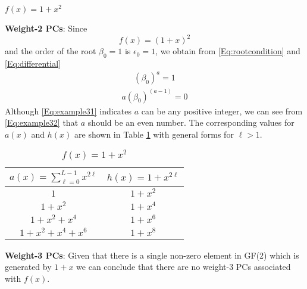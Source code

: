 \begin{example}
	$f(x)=1+x^2$\newline
	
	\textbf{Weight-2 PCs}: Since 
	\[
	f(x)=(1+x)^2\]
	and the order of the root $\beta_0=1$ is $\epsilon_0=1$, we obtain from \eqref{Eq:rootcondition} and \eqref{Eq:differential}
	\begin{align}
		(\beta_0)^a = 1
		\label{Eq:example31}
	\end{align}
	\begin{align}
		a(\beta_0)^{(a-1)} = 0
		\label{Eq:example32}
	\end{align}	
	Although \eqref{Eq:example31} indicates $a$ can be any positive integer, we can see from \eqref{Eq:example32} that $a$ should be an even number.
	The corresponding values for $a(x)$ and $h(x)$ are shown in Table \ref{novelTab1} with general forms for $\ell>1$.
	\begin{table}[htbp]
		\renewcommand{\arraystretch}{1.3}
		\caption{$f(x)=1+x^2$}
		\centering
		\begin{tabular}{c c } 
			\hline
			$a(x)=\sum_{\ell=0}^{L-1} x^{2\ell}$ & $h(x)=1+x^{2\ell}$ \\ [0.5ex] 
			\hline\hline
			$1$ & $1+x^2$\\ 
			$1+x^2$ & $1+x^4$ \\
			$1+x^2+x^4$ & $1+x^6$\\
			$1+x^2+x^4+x^6$ & $1+x^8$ 
		\end{tabular}
		\label{novelTab1}
	\end{table}
	
	\textbf{Weight-3 PCs}:
	Given that there is a single non-zero element in GF(2) which is generated by $1+x$ we can conclude that there are no weight-3 PCs associated with $f(x)$.
\label{ex-3}
\end{example}



